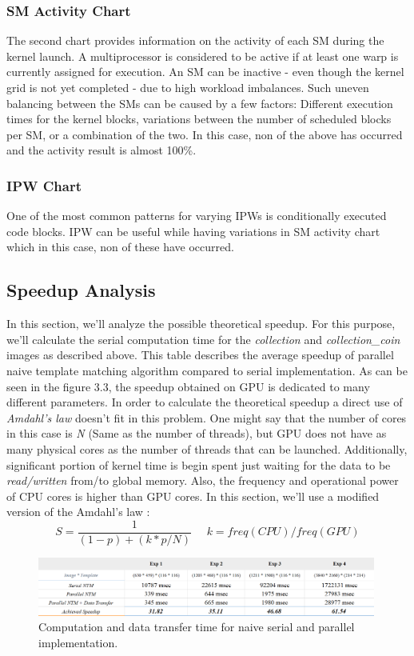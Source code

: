 \subsubsection{SM Activity Chart}
The second chart provides information on the activity of each SM during the kernel launch. A multiprocessor is considered to be active if at least one warp is currently assigned for execution. An SM can be inactive - even though the kernel grid is not yet completed - due to high workload imbalances. Such uneven balancing between the SMs can be caused by a few factors: Different execution times for the kernel blocks, variations between the number of scheduled blocks per SM, or a combination of the two. In this case, non of the above has occurred and the activity result is almost 100\%.

\subsubsection{IPW Chart}
One of the most common patterns for varying IPWs is conditionally executed code blocks. IPW can be useful while having variations in SM activity chart which in this case, non of these have occurred.

\subsection{Speedup Analysis}
In this section, we'll analyze the possible theoretical speedup. For this purpose, we'll calculate the serial computation time for the \textit{collection} and \textit{collection\_coin} images as described above. This table describes the average speedup of parallel naive template matching algorithm compared to serial implementation. As can be seen in the figure 3.3, the speedup obtained on GPU is dedicated to many different parameters. In order to calculate the theoretical speedup a direct use of \textit{Amdahl's law} doesn't fit in this problem. One might say that the number of cores in this case is \textit{N} (Same as the number of threads), but GPU does not have as many physical cores as the number of threads that can be launched. Additionally, significant portion of kernel time is begin spent just waiting for the data to be \textit{read/written} from/to global memory. Also, the frequency and operational power of CPU cores is higher than GPU cores. In this section, we'll use a modified version of the Amdahl's law \cite{amdahl}:
\begin{equation}
	S = \frac{1}{(1 - p) + (k * p / N)} \ \ \ \ \  \ k = freq(CPU) / freq(GPU)
\end{equation}
\begin{figure}[!h]\centering
	\includegraphics[width=0.99\textwidth]{speedup.PNG}
	\caption{Computation and data transfer time for naive serial and parallel implementation.}
	\label{pl1}
\end{figure}